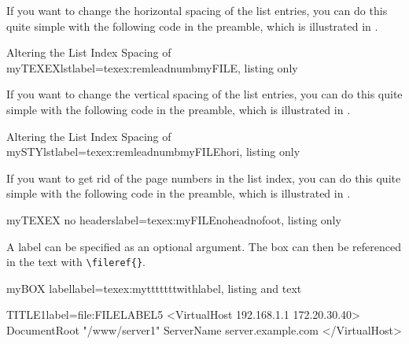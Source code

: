 \documentclass[]{myHOWTO-V001}
\begin{document}
If you want to change the horizontal spacing of the list entries, you can do this quite simple with the following code in the preamble, which is illustrated in .

\begin{myTEXEXdoclst}{Altering the List Index Spacing of myTEXEXlst}{label={texex:remleadnumbmyFILE}, listing only}
\makeatletter
	\renewcommand{\l@myFILE}{\@dottedtocline{1}{0mm}{0mm}}
\makeatother
\end{myTEXEXdoclst}

If you want to change the vertical spacing of the list entries, you can do this quite simple with the following code in the preamble, which is illustrated in .

\begin{myTEXEXdoclst}{Altering the List Index Spacing of mySTYlst}{label={texex:remleadnumbmyFILEhori}, listing only}
\makeatletter
\makeatother
\end{myTEXEXdoclst}

If you want to get rid of the page numbers in the list index, you can do this quite simple with the following code in the preamble, which is illustrated in .

\begin{myTEXEXdoclst}{myTEXEX no headers}{label={texex:myFILEnoheadnofoot}, listing only}
\let\oldlistofmyFILE\listofmyFILE

\renewcommand\listofmyFILE
{
	\pagestyle{empty} %
	\oldlistofmyFILE %
	\clearpage %
	\pagestyle{plain} %
}
\end{myTEXEXdoclst}

A label can be specified as an optional argument. The box can then be referenced in the text with \Verb|\fileref{}|.

\begin{myTEXEXdoclst}{myBOX label}{label={texex:mytttttttwithlabel}, listing and text}
\begin{myFILElst}{TITLE1}{label={file:FILELABEL5}}
<VirtualHost 192.168.1.1 172.20.30.40>
	DocumentRoot "/www/server1"
	ServerName server.example.com
	</VirtualHost>
\end{myFILElst}
\end{myTEXEXdoclst}
\end{document}

